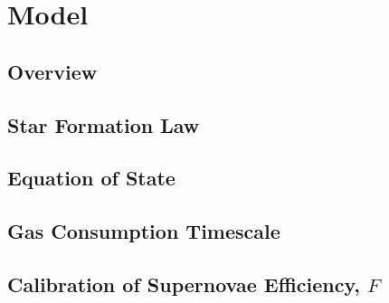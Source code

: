 \chapter{Model}

\section{Overview}


\section{Star Formation Law}


\section{Equation of State}


\section{Gas Consumption Timescale}


\section{Calibration of Supernovae Efficiency, $F$}


